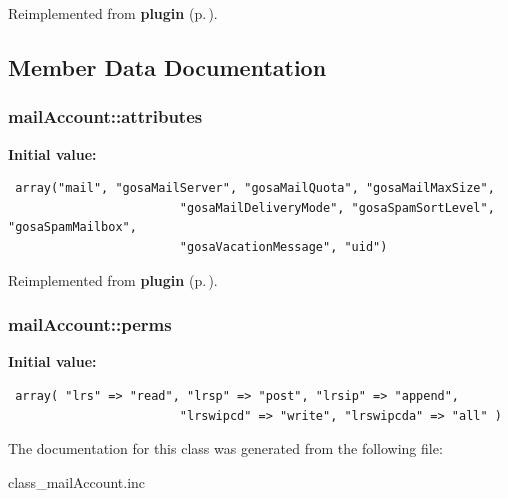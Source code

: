 Reimplemented from {\bf plugin} {\rm (p.\,\pageref{classplugin_a1})}.

\subsection{Member Data Documentation}
\subsubsection{\setlength{\rightskip}{0pt plus 5cm}mail\-Account::attributes}\label{classmailAccount_o19}


{\bf Initial value:}

\footnotesize\begin{verbatim} array("mail", "gosaMailServer", "gosaMailQuota", "gosaMailMaxSize",
                        "gosaMailDeliveryMode", "gosaSpamSortLevel", "gosaSpamMailbox",
                        "gosaVacationMessage", "uid")
\end{verbatim}\normalsize 


Reimplemented from {\bf plugin} {\rm (p.\,\pageref{classplugin})}.
\subsubsection{\setlength{\rightskip}{0pt plus 5cm}mail\-Account::perms}\label{classmailAccount_o18}


{\bf Initial value:}

\footnotesize\begin{verbatim} array( "lrs" => "read", "lrsp" => "post", "lrsip" => "append",
                        "lrswipcd" => "write", "lrswipcda" => "all" )
\end{verbatim}\normalsize 


The documentation for this class was generated from the following file:\begin{CompactItemize}
\item 
class\_\-mail\-Account.inc\end{CompactItemize}
